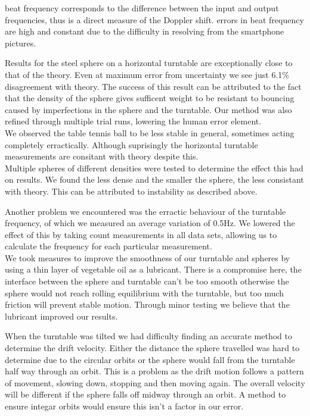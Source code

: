\documentclass[a4paper,10pt,journal]{IEEEtran}
\begin{document}
beat frequency corresponds to the difference between the input and output frequencies, thus is a direct measure of the Doppler shift.
errors in beat frequency are high and constant due to the difficulty in resolving from the smartphone pictures.

Results for the steel sphere on a horizontal turntable are exceptionally close to that of the theory. Even at maximum error from uncertainty we see just 6.1\% disagreement with theory. The success of this result can be attributed to the fact that the density of the sphere gives sufficent weight to be resistant to bouncing caused by imperfections in the sphere and the turntable. Our method was also refined through multiple trial runs, lowering the human error element.\\
We observed the table tennis ball to be less stable in general, sometimes acting completely erractically. Although suprisingly the horizontal turntable measurements are consitant with theory despite this.\\

Multiple spheres of different densities were tested to determine the effect this had on results. We found the less dense and the smaller the sphere, the less consistant with theory. This can be attributed to instability as described above.

Another problem we encountered was the erractic behaviour of the turntable frequency, of which we measured an average variation of 0.5Hz. We lowered the effect of this by taking count measurements in all data sets, allowing us to calculate the frequency for each particular measurement.\\
We took measures to improve the smoothness of our turntable and spheres by using a thin layer of vegetable oil as a lubricant. There is a compromise here, the interface between the sphere and turntable can't be too smooth otherwise the sphere would not reach rolling equilibrium with the turntable, but too much friction will prevent stable motion. Through minor testing we believe that the lubricant improved our results.

When the turntable was tilted we had difficulty finding an accurate method to determine the drift velocity. Either the distance the sphere travelled was hard to determine due to the circular orbits or the sphere would fall from the turntable half way through an orbit. This is a problem as the drift motion follows a pattern of movement, slowing down, stopping and then moving again. The overall velocity will be different if the sphere falls off midway through an orbit. A method to ensure integar orbits would ensure this isn't a factor in our error.
\end{document}

